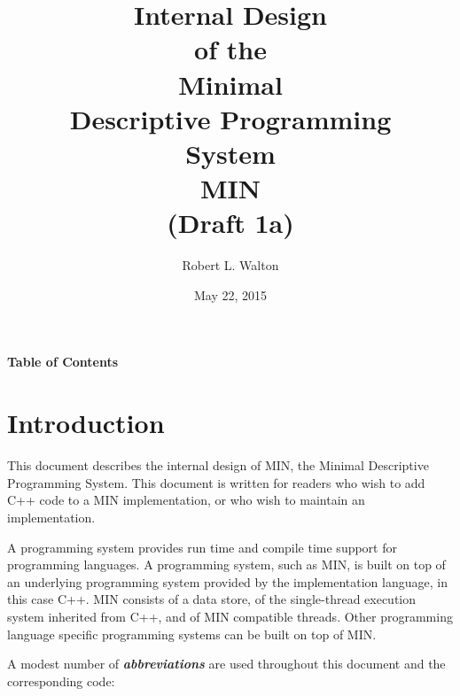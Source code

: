 \documentclass[12pt]{article}
\makeatletter
\renewcommand\tableofcontents{%
    \begin{list}{}%
	     {\setlength{\itemsep}{0in}%
	      \setlength{\topsep}{0in}%
	      \setlength{\parsep}{1ex}%
	      \setlength{\labelwidth}{0in}%
	      \setlength{\baselineskip}{1.5ex}%
	      \setlength{\leftmargin}{0.8in}%
	      \setlength{\rightmargin}{0.8in}}%
    \item\@starttoc{toc}%
    \end{list}}
\newcommand{\skey}[2]{{\bf \em #1#2}\index{#1}}
\makeatother
\begin{document}
        
\title{Internal Design\\[2ex]of the\\[2ex]
       Minimal\\Descriptive Programming\\System\\[2ex]MIN\\[2ex]
       (Draft 1a)}

\author{Robert L. Walton}

\date{May 22, 2015}
 
\maketitle

\newpage
\begin{center}
\large \bf Table of Contents
\end{center}

\bigskip

\tableofcontents 

\newpage

\section{Introduction}

This document describes the internal design of MIN,
the Minimal Descriptive Programming System.
This document is written for readers who wish to add C++ code
to a MIN implementation, or who wish to maintain an implementation.

A programming system provides run time and compile time support
for programming languages.
A programming system, such as MIN, is
built on top of an underlying programming system provided by the
implementation language, in this case C++.
MIN consists of a data store, of the single-thread execution system
inherited from C++, and of MIN compatible threads.
Other programming language specific
programming systems can be built on top of MIN.

A modest number of \skey{abbreviation}s are used throughout this document
and the corresponding code:
\end{document}
